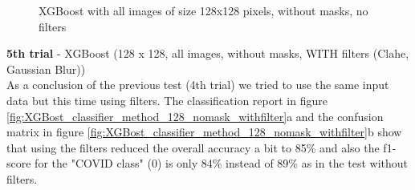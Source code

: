 \documentclass{article}
\begin{document}
\begin{figure}[!ht]
  \centering
  \qquad
  \caption{XGBoost with all images of size 128x128 pixels, without masks, no filters}
  \label{fig:XGBost_classifier_method_128_nomask_nofilter}
\end{figure}



\textbf{5th trial} - XGBoost (128 x 128, all images, without masks, WITH filters (Clahe, Gaussian Blur))\\
As a conclusion of the previous test (4th trial) we tried to use the same input data but this time using filters. The classification report in 
figure \ref{fig:XGBost_classifier_method_128_nomask_withfilter}a and the confusion matrix in figure \ref{fig:XGBost_classifier_method_128_nomask_withfilter}b show
that using the filters reduced the overall accuracy a bit to 85\% and also the f1-score for the "COVID class" (0) is only 84\% instead of 89\% as in the 
test without filters. 
\end{document}
